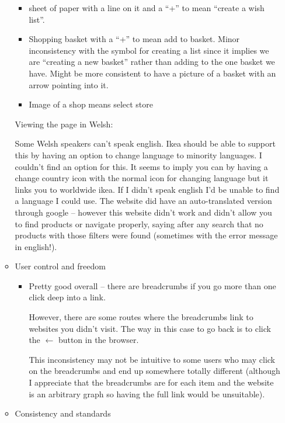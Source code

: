 \documentclass[10pt,\jkfside,a4paper]{article}
\begin{document}
\begin{enumerate}
\begin{itemize}
\begin{itemize}
\item sheet of paper with a line on it and a ``+'' to mean ``create a wish list''.

\item Shopping basket with a ``+'' to mean add to basket. Minor inconsistency with the
symbol for creating a list since it implies we are ``creating a new basket'' rather than adding
to the one basket we have. Might be more consistent to have a picture of a basket with
an arrow pointing into it.

\item Image of a shop means select store

\end{itemize}

Viewing the page in Welsh:

Some Welsh speakers can't speak english. Ikea should be able to support this by having an option
to change language to minority languages. I couldn't find an option for this.
It seems to imply you can by having a change country icon with the normal icon for
changing language but it links you to worldwide ikea. If I didn't speak english I'd be
unable to find a language I could use. The website did have an auto-translated version through
google -- however this website didn't work and didn't allow you to find products or navigate properly,
saying after any search that no products with those filters were found (sometimes with the error message in english!).

\item User control and freedom

\begin{itemize}

\item Pretty good overall -- there are breadcrumbs if you go more than one
click deep into a link.

However, there are some routes where the breadcrumbs link to websites you didn't visit.
The way in this case to go back is to click the $\leftarrow$ button in the browser.

This inconsistency may not be intuitive to some users who may click on the breadcrumbs and
end up somewhere totally different (although I appreciate that the breadcrumbs are for each
item and the website is an arbitrary graph so having the full link would be unsuitable).

\end{itemize}

\item Consistency and standards


\end{itemize}
\end{enumerate}
\end{document}
